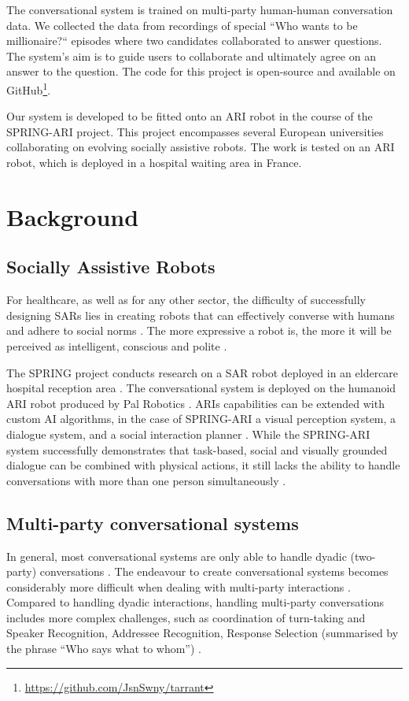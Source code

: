 \documentclass[hidelinks, 11pt]{article}
\begin{document}
The conversational system is trained on multi-party human-human conversation data. We collected the data from recordings of special “Who wants to be millionaire?“ episodes where two candidates collaborated to answer questions. The system's aim is to guide users to collaborate and ultimately agree on an answer to the question. The code for this project is open-source and available on GitHub\footnote[1]{\url{https://github.com/JsnSwny/tarrant}}.

Our system is developed to be fitted onto an ARI robot in the course of the SPRING-ARI project. This project encompasses several European universities collaborating on evolving socially assistive robots. The work is tested on an ARI robot, which is deployed in a hospital waiting area in France.

\section{Background}
\label{sec:background}

\subsection{Socially Assistive Robots}
\label{subsec:socially_assistive_robots}
For healthcare, as well as for any other sector, the difficulty of successfully designing SARs lies in creating robots that can effectively converse with humans and adhere to social norms \cite{moujahid_multi_party_2022}. The more expressive a robot is, the more it will be perceived as intelligent, conscious and polite \cite{moujahid_multi_party_2022}.

The SPRING project conducts research on a SAR robot deployed in an eldercare hospital reception area \cite{addlesee_comprehensive_2020}. The conversational system is deployed on the humanoid ARI robot produced by Pal Robotics \cite{palrobot}. ARIs capabilities can be extended with custom AI algorithms, in the case of SPRING-ARI a visual perception system, a dialogue system, and a social interaction planner \cite{addlesee_comprehensive_2020}. While the SPRING-ARI system successfully demonstrates that task-based, social and visually grounded dialogue can be combined with physical actions, it still lacks the ability to handle conversations with more than one person simultaneously \cite{addlesee_comprehensive_2020}.

\subsection{Multi-party conversational systems}
\label{subsec:multi_party}
In general, most conversational systems are only able to handle dyadic (two-party) conversations \cite{Mahajan_Santhanam_Shaikh_2022,moujahid_multi_party_2022}. The endeavour to create conversational systems becomes considerably more difficult when dealing with multi-party interactions \cite{Addlesee_Data_2023}. Compared to handling dyadic interactions, handling multi-party conversations includes more complex challenges, such as coordination of turn-taking and Speaker Recognition, Addressee Recognition, Response Selection (summarised by the phrase ``Who says what to whom'') \cite{Addlesee_Data_2023,Johansson_Skantze_2015}.
\end{document}
